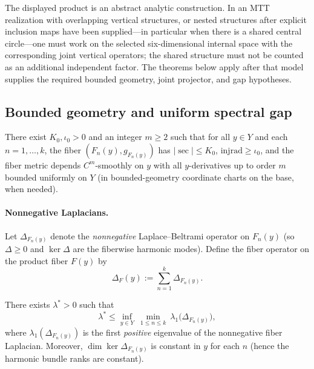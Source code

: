 \documentclass[11pt]{article}
\providecommand{\lamstar}{\ensuremath{\lambda^{\ast}}}
\begin{document}
\begin{remark}
The displayed product is an abstract analytic construction. In an MTT
realization with overlapping vertical structures, or nested structures after
explicit inclusion maps have been supplied---in particular when there is a
shared central circle---one must work on the selected six-dimensional internal
space with the corresponding joint vertical operators; the shared structure
must not be counted as an additional independent factor. The theorems below
apply after that model supplies the required bounded geometry, joint projector,
and gap hypotheses.
\end{remark}

\subsection{Bounded geometry and uniform spectral gap}

\begin{assumption}\label{ass:bounded-geom}
There exist $K_0,\iota_0>0$ and an integer $m\ge 2$ such that for all $y\in Y$ and each $n=1,\dots,k$,
the fiber $(F_n(y),g_{F_n(y)})$ has $|\sec|\le K_0$, $\mathrm{injrad}\ge \iota_0$,
and the fiber metric depends $C^m$-smoothly on $y$ with all $y$-derivatives up to order $m$
bounded uniformly on $Y$ (in bounded-geometry coordinate charts on the base, when needed).
\end{assumption}

\paragraph{Nonnegative Laplacians.}
Let $\Delta_{F_n(y)}$ denote the \emph{nonnegative} Laplace--Beltrami operator on $F_n(y)$ (so $\Delta\ge 0$ and $\ker\Delta$ are the fiberwise harmonic modes).
Define the fiber operator on the product fiber $F(y)$ by
\[
\Delta_F(y) := \sum_{n=1}^k \Delta_{F_n(y)}.
\]

\begin{assumption}\label{ass:gap}
There exists $\lamstar>0$ such that
\[
\lamstar \le \inf_{y\in Y}\ \min_{1\le n\le k}\ \lambda_1\!\big(\Delta_{F_n(y)}\big),
\]
where $\lambda_1(\Delta_{F_n(y)})$ is the first \emph{positive} eigenvalue of the nonnegative fiber Laplacian.
Moreover, $\dim\ker\Delta_{F_n(y)}$ is constant in $y$ for each $n$ (hence the harmonic bundle ranks are constant).
\end{assumption}
\end{document}
